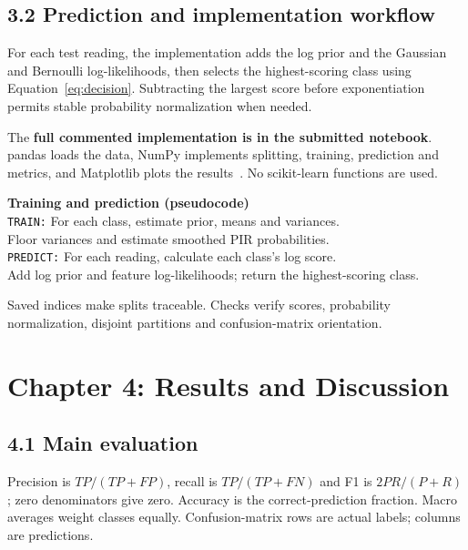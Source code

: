 \documentclass[12pt,a4paper]{article}
\begin{document}
\subsection{3.2 Prediction and implementation workflow}
For each test reading, the implementation adds the log prior and the Gaussian and Bernoulli log-likelihoods, then selects the highest-scoring class using Equation~\eqref{eq:decision}. Subtracting the largest score before exponentiation permits stable probability normalization when needed.

The \textbf{full commented implementation is in the submitted notebook}. pandas loads the data, NumPy implements splitting, training, prediction and metrics, and Matplotlib plots the results~\cite{numpy,pandas,matplotlib}. No scikit-learn functions are used.

\vspace{4pt}
\noindent\begin{minipage}{\linewidth}
\textbf{Training and prediction (pseudocode)}\\
\texttt{TRAIN:} For each class, estimate prior, means and variances.\\
\hspace*{1em}Floor variances and estimate smoothed PIR probabilities.\\
\texttt{PREDICT:} For each reading, calculate each class's log score.\\
\hspace*{1em}Add log prior and feature log-likelihoods; return the highest-scoring class.
\end{minipage}
\vspace{4pt}

Saved indices make splits traceable. Checks verify scores, probability normalization, disjoint partitions and confusion-matrix orientation.

\clearpage
\section{Chapter 4: Results and Discussion}
\subsection{4.1 Main evaluation}
Precision is $TP/(TP+FP)$, recall is $TP/(TP+FN)$ and F1 is $2PR/(P+R)$; zero denominators give zero. Accuracy is the correct-prediction fraction. Macro averages weight classes equally. Confusion-matrix rows are actual labels; columns are predictions.
\end{document}
